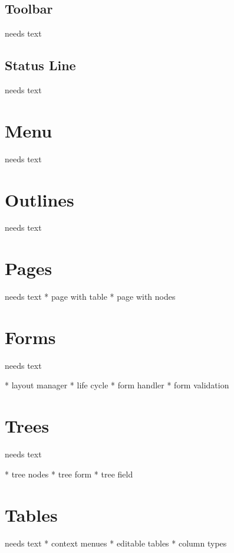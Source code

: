 \documentclass[a4paper,10pt,twoside]{book}
\begin{document}
\subsection{Toolbar}
needs text

\subsection{Status Line}
needs text

\section{Menu}
needs text

\section{Outlines}
needs text

\section{Pages}
needs text
    * page with table
	* page with nodes

\section{Forms}
needs text

    * layout manager
    * life cycle
	* form handler
	* form validation

\section{Trees}
needs text

    * tree nodes
	* tree form
	* tree field

\section{Tables}
needs text
	* context menues
	* editable tables
    * column types
\end{document}
